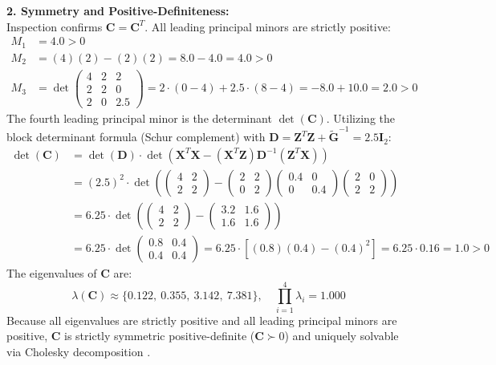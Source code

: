 \documentclass[11pt,twoside,openright]{book}
\begin{document}
\textbf{2. Symmetry and Positive-Definiteness:}\\
Inspection confirms $\mathbf{C} = \mathbf{C}^T$. All leading principal minors are strictly positive:
\begin{align*}
M_1 &= 4.0 > 0 \\
M_2 &= (4)(2) - (2)(2) = 8.0 - 4.0 = 4.0 > 0 \\
M_3 &= \det \begin{pmatrix} 4 & 2 & 2 \\ 2 & 2 & 0 \\ 2 & 0 & 2.5 \end{pmatrix} = 2 \cdot (0 - 4) + 2.5 \cdot (8 - 4) = -8.0 + 10.0 = \mathbf{2.0} > 0
\end{align*}
The fourth leading principal minor is the determinant $\det(\mathbf{C})$. Utilizing the block determinant formula (Schur complement) with $\mathbf{D} = \mathbf{Z}^T\mathbf{Z} + \widetilde{\mathbf{G}}^{-1} = 2.5\mathbf{I}_2$:
\begin{align*}
\det(\mathbf{C}) &= \det(\mathbf{D}) \cdot \det\left( \mathbf{X}^T\mathbf{X} - (\mathbf{X}^T\mathbf{Z})\mathbf{D}^{-1}(\mathbf{Z}^T\mathbf{X}) \right) \\
&= (2.5)^2 \cdot \det\left( \begin{pmatrix} 4 & 2 \\ 2 & 2 \end{pmatrix} - \begin{pmatrix} 2 & 2 \\ 0 & 2 \end{pmatrix} \begin{pmatrix} 0.4 & 0 \\ 0 & 0.4 \end{pmatrix} \begin{pmatrix} 2 & 0 \\ 2 & 2 \end{pmatrix} \right) \\
&= 6.25 \cdot \det\left( \begin{pmatrix} 4 & 2 \\ 2 & 2 \end{pmatrix} - \begin{pmatrix} 3.2 & 1.6 \\ 1.6 & 1.6 \end{pmatrix} \right) \\
&= 6.25 \cdot \det\begin{pmatrix} 0.8 & 0.4 \\ 0.4 & 0.4 \end{pmatrix} = 6.25 \cdot \left[ (0.8)(0.4) - (0.4)^2 \right] = 6.25 \cdot 0.16 = \mathbf{1.0} > 0
\end{align*}
The eigenvalues of $\mathbf{C}$ are:
$$\lambda(\mathbf{C}) \approx \{0.122, \ 0.355, \ 3.142, \ 7.381\}, \quad \prod_{i=1}^4 \lambda_i = 1.000$$
Because all eigenvalues are strictly positive and all leading principal minors are positive, $\mathbf{C}$ is strictly symmetric positive-definite ($\mathbf{C} \succ 0$) and uniquely solvable via Cholesky decomposition \cite{henderson1953, pinheiro2000mixed}.
\end{document}
